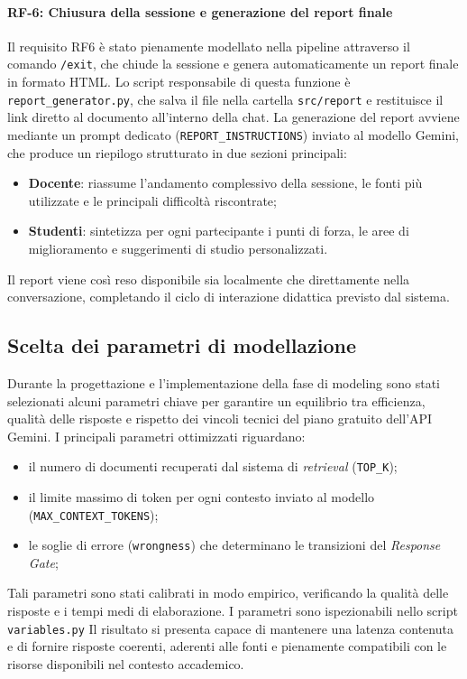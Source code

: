 \documentclass[a4paper,9pt]{article}
\begin{document}
\paragraph{RF-6: Chiusura della sessione e generazione del report finale}

Il requisito RF6 è stato pienamente modellato nella pipeline attraverso il comando \texttt{/exit}, che chiude la sessione e genera automaticamente un report finale in formato HTML.  
Lo script responsabile di questa funzione è \texttt{report\_generator.py}, che salva il file nella cartella \texttt{src/report} e restituisce il link diretto al documento all’interno della chat.  
La generazione del report avviene mediante un prompt dedicato (\texttt{REPORT\_INSTRUCTIONS}) inviato al modello Gemini, che produce un riepilogo strutturato in due sezioni principali:
\begin{itemize}
	\item \textbf{Docente}: riassume l’andamento complessivo della sessione, le fonti più utilizzate e le principali difficoltà riscontrate;
	\item \textbf{Studenti}: sintetizza per ogni partecipante i punti di forza, le aree di miglioramento e suggerimenti di studio personalizzati.
\end{itemize}
Il report viene così reso disponibile sia localmente che direttamente nella conversazione, completando il ciclo di interazione didattica previsto dal sistema.

\subsection{Scelta dei parametri di modellazione}

Durante la progettazione e l'implementazione della fase di modeling sono stati selezionati alcuni parametri chiave per garantire un equilibrio tra efficienza, qualità delle risposte e rispetto dei vincoli tecnici del piano gratuito dell'API Gemini. 
I principali parametri ottimizzati riguardano:
\begin{itemize}
	\item il numero di documenti recuperati dal sistema di \textit{retrieval} (\texttt{TOP\_K});
	\item il limite massimo di token per ogni contesto inviato al modello (\texttt{MAX\_CONTEXT\_TOKENS});
	\item le soglie di errore (\texttt{wrongness}) che determinano le transizioni del \textit{Response Gate};
\end{itemize}
Tali parametri sono stati calibrati in modo empirico, verificando la qualità delle risposte e i tempi medi di elaborazione. I parametri sono ispezionabili nello script \texttt{variables.py}  
Il risultato si presenta capace di mantenere una latenza contenuta e di fornire risposte coerenti, aderenti alle fonti e pienamente compatibili con le risorse disponibili nel contesto accademico.
\end{document}
